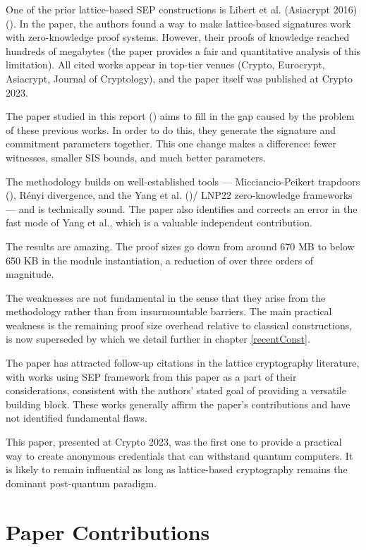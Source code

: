 \documentclass[a4paper]{article}
\begin{document}
One of the prior lattice-based SEP constructions is Libert et al. (Asiacrypt 2016) (\cite{LLM+16}). In the paper, the authors found a way to make lattice-based signatures work with zero-knowledge proof systems. However, their proofs of knowledge reached hundreds of megabytes (the paper provides a fair and quantitative analysis of this limitation). All cited works appear in top-tier venues (Crypto, Eurocrypt, Asiacrypt, Journal of Cryptology), and the paper itself was published at Crypto 2023.

The paper studied in this report (\cite{mainPaper}) aims to fill in the gap caused by the problem of these previous works. In order to do this, they generate the signature and commitment parameters together. This one change makes a difference: fewer witnesses, smaller SIS bounds, and much better parameters.

The methodology builds on well-established tools — Micciancio-Peikert trapdoors (\cite{MP12}), Rényi divergence, and the Yang et al. (\cite{YangAZXYW19-0})/ LNP22 zero-knowledge frameworks — and is technically sound. The paper also identifies and corrects an error in the fast mode of Yang et al., which is a valuable independent contribution.

The results are amazing. The proof sizes go down from around 670 MB to below 650 KB in the module instantiation, a reduction of over three orders of magnitude.

The weaknesses are not fundamental in the sense that they arise from the methodology rather than from insurmountable barriers. The main practical weakness is the remaining proof size overhead relative to classical constructions, \cite{mainPaper} is now superseded by \cite{newPaper} which we detail further in chapter \ref{recentConst}.  

The paper has attracted follow-up citations in the lattice cryptography literature, with works using SEP framework from this paper as a part of their considerations, consistent with the authors' stated goal of providing a versatile building block. These works generally affirm the paper's contributions and have not identified fundamental flaws.

This paper, presented at Crypto 2023, was the first one to provide a practical way to create anonymous credentials that can withstand quantum computers. It is likely to remain influential as long as lattice-based cryptography remains the dominant post-quantum paradigm.

\section{Paper Contributions}
\end{document}
